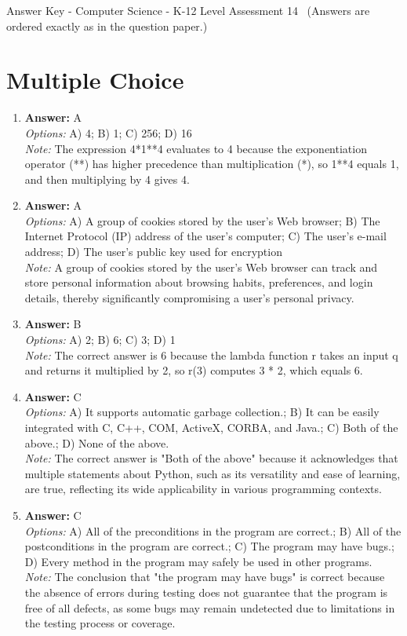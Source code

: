 \documentclass[12pt]{article}
\begin{document}
\begin{center}
Answer Key - Computer Science - K-12 Level Assessment 14 \
\small (Answers are ordered exactly as in the question paper.)
\end{center}

\section*{Multiple Choice}
\begin{enumerate}[label=\arabic*.]
\item \textbf{Answer:} A
\\ \textit{Options:} A) 4; B) 1; C) 256; D) 16
\\ \textit{Note:} The expression 4*1**4 evaluates to 4 because the exponentiation operator (**) has higher precedence than multiplication (*), so 1**4 equals 1, and then multiplying by 4 gives 4.
\item \textbf{Answer:} A
\\ \textit{Options:} A) A group of cookies stored by the user's Web browser; B) The Internet Protocol (IP) address of the user's computer; C) The user's e-mail address; D) The user's public key used for encryption
\\ \textit{Note:} A group of cookies stored by the user's Web browser can track and store personal information about browsing habits, preferences, and login details, thereby significantly compromising a user's personal privacy.
\item \textbf{Answer:} B
\\ \textit{Options:} A) 2; B) 6; C) 3; D) 1
\\ \textit{Note:} The correct answer is 6 because the lambda function r takes an input q and returns it multiplied by 2, so r(3) computes 3 * 2, which equals 6.
\item \textbf{Answer:} C
\\ \textit{Options:} A) It supports automatic garbage collection.; B) It can be easily integrated with C, C++, COM, ActiveX, CORBA, and Java.; C) Both of the above.; D) None of the above.
\\ \textit{Note:} The correct answer is "Both of the above" because it acknowledges that multiple statements about Python, such as its versatility and ease of learning, are true, reflecting its wide applicability in various programming contexts.
\item \textbf{Answer:} C
\\ \textit{Options:} A) All of the preconditions in the program are correct.; B) All of the postconditions in the program are correct.; C) The program may have bugs.; D) Every method in the program may safely be used in other programs.
\\ \textit{Note:} The conclusion that "the program may have bugs" is correct because the absence of errors during testing does not guarantee that the program is free of all defects, as some bugs may remain undetected due to limitations in the testing process or coverage.
\end{enumerate}
\end{document}
